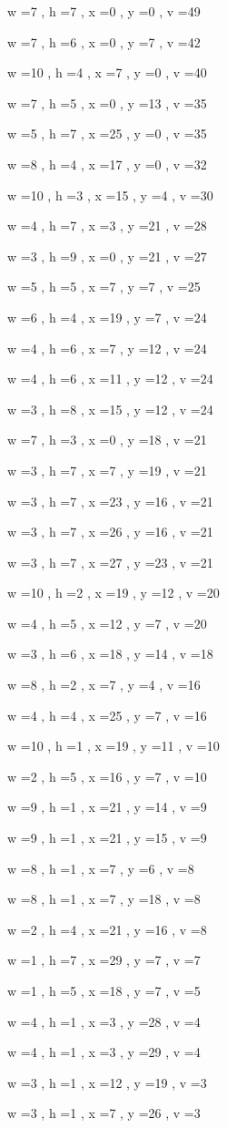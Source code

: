 \documentclass[11pt]{article}
\begin{document}
w =7 , h =7 , x =0 , y =0 , v =49
\par
w =7 , h =6 , x =0 , y =7 , v =42
\par
w =10 , h =4 , x =7 , y =0 , v =40
\par
w =7 , h =5 , x =0 , y =13 , v =35
\par
w =5 , h =7 , x =25 , y =0 , v =35
\par
w =8 , h =4 , x =17 , y =0 , v =32
\par
w =10 , h =3 , x =15 , y =4 , v =30
\par
w =4 , h =7 , x =3 , y =21 , v =28
\par
w =3 , h =9 , x =0 , y =21 , v =27
\par
w =5 , h =5 , x =7 , y =7 , v =25
\par
w =6 , h =4 , x =19 , y =7 , v =24
\par
w =4 , h =6 , x =7 , y =12 , v =24
\par
w =4 , h =6 , x =11 , y =12 , v =24
\par
w =3 , h =8 , x =15 , y =12 , v =24
\par
w =7 , h =3 , x =0 , y =18 , v =21
\par
w =3 , h =7 , x =7 , y =19 , v =21
\par
w =3 , h =7 , x =23 , y =16 , v =21
\par
w =3 , h =7 , x =26 , y =16 , v =21
\par
w =3 , h =7 , x =27 , y =23 , v =21
\par
w =10 , h =2 , x =19 , y =12 , v =20
\par
w =4 , h =5 , x =12 , y =7 , v =20
\par
w =3 , h =6 , x =18 , y =14 , v =18
\par
w =8 , h =2 , x =7 , y =4 , v =16
\par
w =4 , h =4 , x =25 , y =7 , v =16
\par
w =10 , h =1 , x =19 , y =11 , v =10
\par
w =2 , h =5 , x =16 , y =7 , v =10
\par
w =9 , h =1 , x =21 , y =14 , v =9
\par
w =9 , h =1 , x =21 , y =15 , v =9
\par
w =8 , h =1 , x =7 , y =6 , v =8
\par
w =8 , h =1 , x =7 , y =18 , v =8
\par
w =2 , h =4 , x =21 , y =16 , v =8
\par
w =1 , h =7 , x =29 , y =7 , v =7
\par
w =1 , h =5 , x =18 , y =7 , v =5
\par
w =4 , h =1 , x =3 , y =28 , v =4
\par
w =4 , h =1 , x =3 , y =29 , v =4
\par
w =3 , h =1 , x =12 , y =19 , v =3
\par
w =3 , h =1 , x =7 , y =26 , v =3
\par
\newpage
\end{document}
